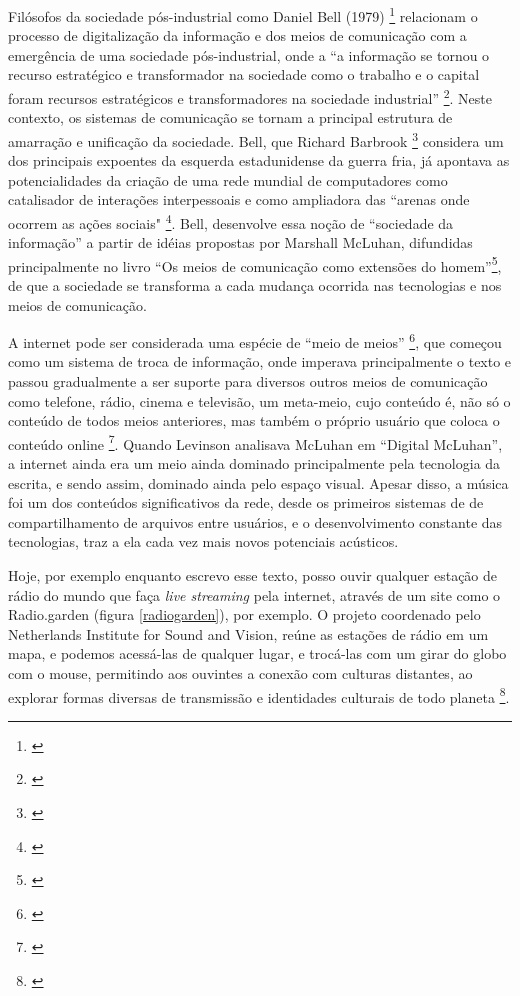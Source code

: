     
 Filósofos da sociedade pós-industrial como Daniel Bell (1979) \footnote{\cite{bell1979thinking}} relacionam o processo de digitalização da informação e dos meios de comunicação com a emergência de uma sociedade pós-industrial, onde a ``a informação se tornou o recurso estratégico e transformador na sociedade como o trabalho e o capital foram recursos estratégicos e transformadores na sociedade industrial'' \footnote{\cite[26]{bell1979thinking}}. Neste contexto, os sistemas de comunicação se tornam a principal estrutura de amarração e unificação da sociedade. Bell, que Richard Barbrook \footnote{\cite{barbrook1999cyber}} considera um dos principais expoentes da esquerda estadunidense da guerra fria, já apontava as potencialidades da criação de uma rede mundial de computadores como catalisador de interações interpessoais e como ampliadora das ``arenas onde ocorrem as ações sociais" \footnote{\cite[22]{bell1979thinking}}. Bell, desenvolve essa noção de ``sociedade da informação'' a partir de idéias propostas por Marshall McLuhan, difundidas principalmente no livro ``Os meios de comunicação como extensões do homem''\footnote{\cite{luhan1964marshall}}, de que a sociedade se  transforma a cada mudança ocorrida nas tecnologias e nos meios de comunicação. 
    
 A internet pode ser considerada uma espécie de ``meio de meios'' \footnote{\cite[5]{Levinson2001}}, que começou como um sistema de troca de informação, onde imperava principalmente o texto e passou gradualmente a ser suporte para diversos outros  meios de comunicação como telefone, rádio, cinema e televisão, um meta-meio, cujo conteúdo é, não só o conteúdo de todos meios anteriores, mas também o próprio usuário que coloca o conteúdo online \footnote{\cite[39]{Levinson2001}}. Quando Levinson analisava McLuhan em ``Digital McLuhan'', a internet ainda era um meio ainda dominado principalmente pela tecnologia da escrita, e sendo assim, dominado ainda pelo espaço visual. Apesar disso, a música foi um dos conteúdos significativos da rede, desde os primeiros sistemas de de compartilhamento de arquivos entre usuários, e o desenvolvimento constante das tecnologias, traz a ela cada vez mais novos potenciais acústicos.
    
Hoje, por exemplo enquanto escrevo esse texto, posso ouvir qualquer estação de rádio do mundo que faça \emph{live streaming} pela internet, através de um site como o Radio.garden (figura \ref{radiogarden}), por exemplo. O projeto coordenado pelo Netherlands Institute for Sound and Vision, reúne as estações de rádio em um mapa, e podemos acessá-las de qualquer lugar, e trocá-las com um girar do globo com o mouse, permitindo aos ouvintes a conexão com culturas distantes, ao explorar formas diversas de transmissão e identidades culturais de todo planeta \footnote{\cite{caroline2016radio}}. 

